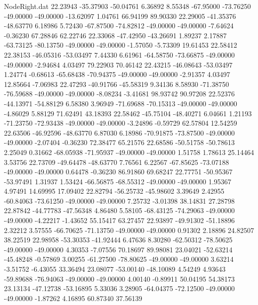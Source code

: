 \begin{filecontents}{NodeRight.dat}
  22.23943  -35.37903  -50.04761     6.36892    8.55348  -67.95000  -73.76250  -49.00000  -49.00000  -13.62097    1.04761   66.94199   89.90330
  22.29005  -41.35376  -48.63770     6.18986    5.72430  -67.87500  -74.82812  -49.00000  -49.00000   -7.64624   -0.36230   67.28846   62.22746
  22.33068  -47.42950  -43.26691     1.89237    2.17887  -63.73125  -80.13750  -49.00000  -49.00000   -1.57050   -5.73309   19.61453   22.58412
  22.38153  -46.05316  -53.03497     7.44330    6.61961  -64.58750  -73.66875  -49.00000  -49.00000   -2.94684    4.03497   79.22903   70.46142
  22.43215  -46.08643  -53.03497     1.24774   -0.68613  -65.68438  -70.94375  -49.00000  -49.00000   -2.91357    4.03497   12.85664   -7.06983
  22.47293  -40.91766  -45.58319     9.34136    8.58930  -71.38750  -76.59688  -49.00000  -49.00000   -8.08234   -3.41681   98.93742   90.97208
  22.52376  -44.13971  -54.88129     6.58380    3.96949  -71.69688  -70.15313  -49.00000  -49.00000   -4.86029    5.88129   71.62491   43.18393
  22.58462  -45.75104  -48.40271     6.04661    1.21193  -71.23750  -72.93438  -49.00000  -49.00000   -3.24896   -0.59729   62.57804   12.54259
  22.63506  -46.92596  -48.63770     6.87030    6.18986  -70.91875  -73.87500  -49.00000  -49.00000   -2.07404   -0.36230   72.38477   65.21576
  22.68586  -50.51758  -50.78613     2.25049    0.31662  -68.05938  -71.95937  -49.00000  -49.00000    1.51758    1.78613   25.14464    3.53756
  22.73709  -49.64478  -48.63770     7.76561    6.22567  -67.85625  -73.07188  -49.00000  -49.00000    0.64478   -0.36230   86.91860   69.68247
  22.77751  -50.95367  -53.97491     1.31937    1.53424  -66.56875  -68.55312  -49.00000  -49.00000    1.95367    4.97491   14.69995   17.09402
  22.82794  -56.25732  -45.98602     3.39649    2.42955  -60.84063  -73.61250  -49.00000  -49.00000    7.25732   -3.01398   38.14831   27.28798
  22.87842  -44.77783  -47.56348     4.86480    5.58105  -68.43125  -74.29063  -49.00000  -49.00000   -4.22217   -1.43652   55.15417   63.27457
  22.93897  -49.91302  -51.18896     2.32212    3.57555  -66.70625  -71.13750  -49.00000  -49.00000    0.91302    2.18896   24.82507   38.22519
  22.98958  -53.30353  -41.92444     6.47636    8.30280  -62.50312  -78.50625  -49.00000  -49.00000    4.30353   -7.07556   70.18697   89.98081
  23.04021  -52.63214  -45.48248    -0.57869    3.00255  -61.27500  -78.80625  -49.00000  -49.00000    3.63214   -3.51752   -6.43055   33.36494
  23.08077  -53.00140  -48.10089     4.54249    4.93643  -59.89688  -76.94063  -49.00000  -49.00000    4.00140   -0.89911   50.04195   54.38173
  23.13134  -47.12738  -53.16895     5.33036    3.28905  -64.04375  -72.12500  -49.00000  -49.00000   -1.87262    4.16895   60.87340   37.56139

\end{filecontents}
